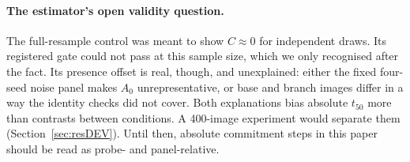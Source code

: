 \paragraph{The estimator's open validity question.} The full-resample control was meant to show $C\approx0$ for independent draws. Its registered gate could not pass at this sample size, which we only recognised after the fact. Its presence offset is real, though, and unexplained: either the fixed four-seed noise panel makes $A_0$ unrepresentative, or base and branch images differ in a way the identity checks did not cover. Both explanations bias absolute $t_{50}$ more than contrasts between conditions. A 400-image experiment would separate them (Section~\ref{sec:resDEV}). Until then, absolute commitment steps in this paper should be read as probe- and panel-relative.

